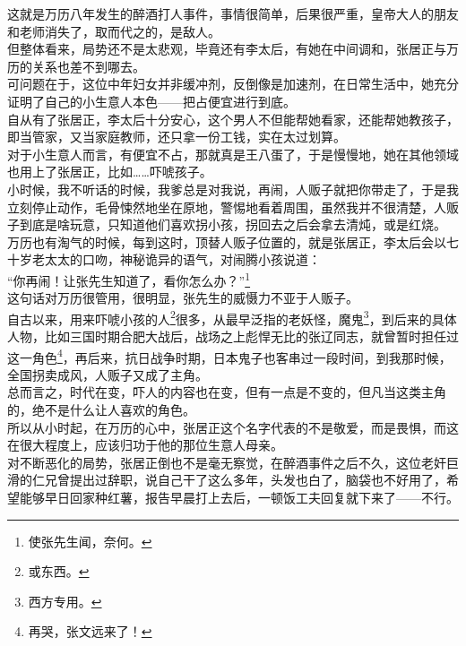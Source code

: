 \begin{multicols}{\theparacolNo}
这就是万历八年发生的醉酒打人事件，事情很简单，后果很严重，皇帝大人的朋友和老师消失了，取而代之的，是敌人。\\

但整体看来，局势还不是太悲观，毕竟还有李太后，有她在中间调和，张居正与万历的关系也差不到哪去。\\

可问题在于，这位中年妇女并非缓冲剂，反倒像是加速剂，在日常生活中，她充分证明了自己的小生意人本色——把占便宜进行到底。\\

自从有了张居正，李太后十分安心，这个男人不但能帮她看家，还能帮她教孩子，即当管家，又当家庭教师，还只拿一份工钱，实在太过划算。\\

对于小生意人而言，有便宜不占，那就真是王八蛋了，于是慢慢地，她在其他领域也用上了张居正，比如……吓唬孩子。\\

小时候，我不听话的时候，我爹总是对我说，再闹，人贩子就把你带走了，于是我立刻停止动作，毛骨悚然地坐在原地，警惕地看着周围，虽然我并不很清楚，人贩子到底是啥玩意，只知道他们喜欢拐小孩，拐回去之后会拿去清炖，或是红烧。\\

万历也有淘气的时候，每到这时，顶替人贩子位置的，就是张居正，李太后会以七十岁老太太的口吻，神秘诡异的语气，对闹腾小孩说道：\\

“你再闹！让张先生知道了，看你怎么办？”\footnote{使张先生闻，奈何。}\\

这句话对万历很管用，很明显，张先生的威慑力不亚于人贩子。\\

自古以来，用来吓唬小孩的人\footnote{或东西。}很多，从最早泛指的老妖怪，魔鬼\footnote{西方专用。}，到后来的具体人物，比如三国时期合肥大战后，战场之上彪悍无比的张辽同志，就曾暂时担任过这一角色\footnote{再哭，张文远来了！}，再后来，抗日战争时期，日本鬼子也客串过一段时间，到我那时候，全国拐卖成风，人贩子又成了主角。\\

总而言之，时代在变，吓人的内容也在变，但有一点是不变的，但凡当这类主角的，绝不是什么让人喜欢的角色。\\

所以从小时起，在万历的心中，张居正这个名字代表的不是敬爱，而是畏惧，而这在很大程度上，应该归功于他的那位生意人母亲。\\

对不断恶化的局势，张居正倒也不是毫无察觉，在醉酒事件之后不久，这位老奸巨滑的仁兄曾提出过辞职，说自己干了这么多年，头发也白了，脑袋也不好用了，希望能够早日回家种红薯，报告早晨打上去后，一顿饭工夫回复就下来了——不行。\\


\end{multicols}
